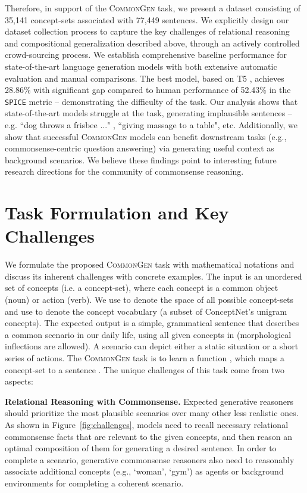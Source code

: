 \documentclass[11pt,a4paper]{article}
\begin{document}
Therefore, in support of the \textsc{CommonGen} task, we present a dataset consisting of 35,141 concept-sets associated with 77,449 sentences.
We explicitly design our dataset collection process to capture the key challenges of relational reasoning and compositional generalization described above, through an actively controlled crowd-sourcing process.
We establish comprehensive baseline performance for state-of-the-art language generation models with both extensive automatic evaluation and manual comparisons. The best model, based on T5 \cite{raffel2019exploring}, achieves 28.86\% with significant gap compared to human performance of 52.43\% in the \texttt{SPICE} metric -- demonstrating the difficulty of the task.
Our analysis shows that state-of-the-art models struggle at the task, generating implausible sentences -- e.g. ``dog throws a frisbee ..." , ``giving massage to a table", etc. 
Additionally,
we show that successful \textsc{CommonGen} models can benefit downstream tasks (e.g., commonsense-centric question answering) via generating useful context as background scenarios.
We believe these findings point to interesting future research directions for the community of commonsense reasoning. 






	 
	
	\section{Task Formulation and Key Challenges}
	\label{sec:formualtion}
	We formulate the proposed \textsc{CommonGen} task with mathematical notations and discuss its inherent challenges with concrete examples. 
	The input is an unordered set of  concepts  (i.e. a concept-set), where each concept  is a common object (noun) or action (verb). 
	We use  to denote the space of all possible concept-sets and use  to denote the concept vocabulary (a subset of ConceptNet's unigram concepts).
	The expected output is a simple, grammatical sentence  that describes a common scenario in our daily life, using  all given concepts in  (morphological inflections are allowed).
	A scenario can depict either a static situation or a short series of actions.
The \textsc{CommonGen} task is to learn a function , which maps a concept-set  to a sentence . 
The unique challenges of this task come from two aspects:
	


	\smallskip
	\noindent
	\textbf{Relational Reasoning with Commonsense.}
	Expected generative reasoners should prioritize the most plausible scenarios over many other less realistic ones.
	As shown in Figure~\ref{fig:challenges},
	models need to recall necessary relational commonsense facts that are relevant to the given concepts, and then reason an optimal composition of them for generating a desired sentence.
In order to complete a scenario,  generative commonsense reasoners also need to reasonably associate additional concepts (e.g., `woman',  `gym') as agents or background environments for completing a coherent scenario. 
\end{document}
